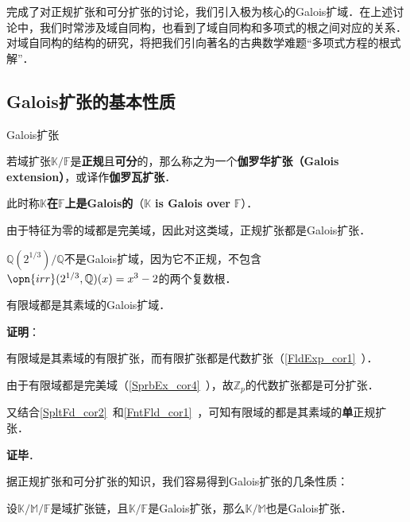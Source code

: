 

完成了对正规扩张和可分扩张的讨论，我们引入极为核心的Galois扩域．在上述讨论中，我们时常涉及域自同构，也看到了域自同构和多项式的根之间对应的关系．对域自同构的结构的研究，将把我们引向著名的古典数学难题“多项式方程的根式解”．



\subsection{Galois扩张的基本性质}

\begin{definition}{Galois扩张}

若域扩张$\mathbb{K}/\mathbb{F}$是\textbf{正规}且\textbf{可分}的，那么称之为一个\textbf{伽罗华扩张（Galois extension）}，或译作\textbf{伽罗瓦扩张}．

此时称$\mathbb{K}$\textbf{在}$\mathbb{F}$\textbf{上是Galois的}（$\mathbb{K}$ \textbf{is Galois over} $\mathbb{F}$）．

\end{definition}

由于特征为零的域都是完美域，因此对这类域，正规扩张都是Galois扩张．

\begin{example}{}
$\mathbb{Q}(2^{1/3})/\mathbb{Q}$不是Galois扩域，因为它不正规，不包含$\opn{irr}(2^{1/3}, \mathbb{Q})(x)=x^3-2$的两个复数根．
\end{example}

\begin{theorem}{}
有限域都是其素域的Galois扩域．
\end{theorem}

\textbf{证明}：

有限域是其素域的有限扩张，而有限扩张都是代数扩张（\autoref{FldExp_cor1}~）．

由于有限域都是完美域（\autoref{SprbEx_cor4}~），故$\mathbb{Z}_p$的代数扩张都是可分扩张．

又结合\autoref{SpltFd_cor2}~和\autoref{FntFld_cor1}~，可知有限域的都是其素域的\textbf{单}正规扩张．

\textbf{证毕}．


据正规扩张和可分扩张的知识，我们容易得到Galois扩张的几条性质：


\begin{theorem}{}
设$\mathbb{K}/\mathbb{M}/\mathbb{F}$是域扩张链，且$\mathbb{K}/\mathbb{F}$是Galois扩张，那么$\mathbb{K}/\mathbb{M}$也是Galois扩张．
\end{theorem}

